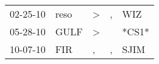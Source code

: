 \begin{supertabular}{p{0.07\textwidth}p{0.06\textwidth}p{0.02\textwidth}p{0.02\textwidth}p{0.06\textwidth}}
 02-25-10\textsuperscript{} &  reso\textsuperscript{} &  \textgreater &  , &   WIZ\textsuperscript{} \\
 05-28-10\textsuperscript{} &  GULF\textsuperscript{} &  \textgreater &    &                   *CS1* \\
 10-07-10\textsuperscript{} &   FIR\textsuperscript{} &             , &  , &  SJIM\textsuperscript{} \\
\end{supertabular}
